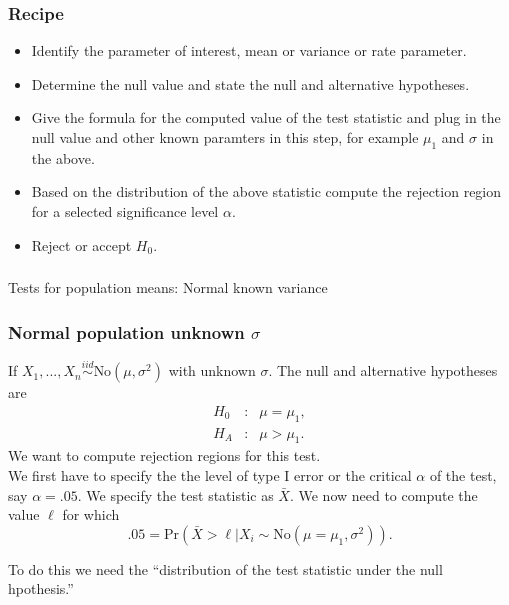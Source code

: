 \begin{frame}[fragile]\frametitle{Recipe}

\begin{itemize}

\item Identify the parameter of interest, mean or variance or
rate parameter.

\item Determine the null value and state the null and alternative hypotheses.

\item Give the formula for the computed value of the test statistic
and plug in the null value and other known paramters in this step,
for example $\mu_1$ and $\sigma$ in the above.

\item Based on the distribution of the above statistic compute
the rejection region for a selected significance level $\alpha$.

\item Reject or accept $H_0$.

\end{itemize}

\end{frame}

\begin{frame}[fragile]\frametitle{}
\begin{center}
{\Large Tests for population means: Normal known variance}

\end{center}
\end{frame}





\begin{frame}[fragile]\frametitle{Normal population unknown $\sigma$}

{\tiny

If $X_1,...,X_n \stackrel{iid}{\sim} \mbox{No}(\mu,\sigma^2)$
with unknown $\sigma$.
The null and alternative hypotheses are
\begin{eqnarray*}
H_0&:& \mu= \mu_1, \\
H_A&:& \mu >  \mu_1.
\end{eqnarray*}
We want to compute rejection regions for this test. \\
We first have to specify the the level of type I error
or the critical $\alpha$ of the test, say $\alpha =.05$.
We specify the test statistic as $\bar{X}$. We now
need to compute the value $\ell$ for which
$$.05 = \mbox{Pr}(\bar{X} > \ell | X_i \sim \mbox{No}(\mu=\mu_1,\sigma^2)).$$

To do this we need the ``distribution of the test statistic under the
null hpothesis.''

 }
\end{frame}


